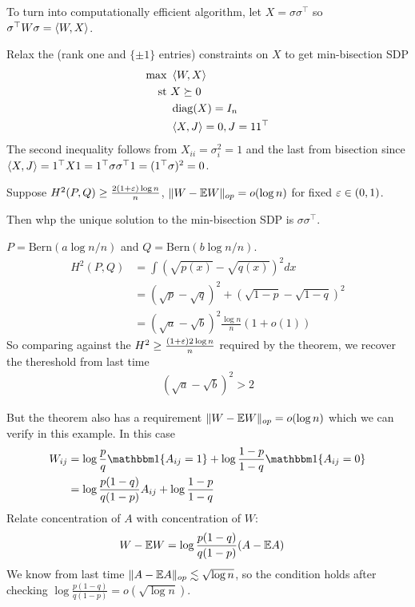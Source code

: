 To turn into computationally efficient algorithm, let
$X = \sigma \sigma^\top$ so $\sigma^\top W \sigma = \braket{W, X}$.

Relax the (rank one and $\{\pm 1\}$ entries) constraints on $X$
to get min-bisection SDP
\begin{align}
  \max~&\braket{W, X} \\
  \text{st}~&X \succeq 0 \\
  &\operatorname{diag}(X) = I_n \\
  &\braket{X, J} = 0, J = 1 1^\top
\end{align}
The second inequality follows from $X_{ii} = \sigma_i^2 = 1$
and the last from bisection since $\braket{X, J} = 1^\top X 1 = 1^\top \sigma \sigma^\top 1 = (1^\top \sigma)^2 = 0$.

\begin{theorem}
  Suppose $H^2(P, Q) \geq \frac{2 (1 + \varepsilon) \log n}{n}$,
  $\|W - \mathbb{E} W\|_{op} = o(\log n)$ for fixed $\varepsilon \in (0,1)$.

  Then whp the unique solution to the min-bisection SDP
  is $\sigma \sigma^\top$.
\end{theorem}

\begin{example}
  $P = \text{Bern}(a \log n / n)$
  and $Q = \text{Bern}(b \log n / n)$.
  \begin{align}
    H^2(P, Q) &= \int (\sqrt{p(x)} - \sqrt{q(x)})^2 dx \\
    &= (\sqrt{p} - \sqrt{q})^2 + (\sqrt{1-p} - \sqrt{1 - q})^2 \\
    &= (\sqrt{a} - \sqrt{b})^2 \frac{\log n}{n} (1 + o(1))
  \end{align}
  So comparing against the $H^2 \geq \frac{(1+\varepsilon) 2 \log n}{n}$ required
  by the theorem, we recover the thereshold from last time
  \begin{align}
    (\sqrt{a} - \sqrt{b})^2 > 2
  \end{align}

  But the theorem also has a requirement $\|W - \mathbb{E} W\|_{op} = o(\log n)$
  which we can verify in this example. In this case
  \begin{align}
    W_{ij} 
    &= \log \frac{p}{q} \ind\{A_{ij} = 1\} + \log \frac{1-p}{1-q} \ind\{A_{ij} = 0\} \\
    &= \log \frac{p (1-q)}{q (1-p)} A_{ij} + \log \frac{1-p}{1-q}
  \end{align}
  Relate concentration of $A$ with concentration of $W$:
  \begin{align}
    W - \mathbb{E} W 
    &= \log \frac{p (1 - q)}{q (1 - p)} (A - \mathbb{E} A)
  \end{align}
  We know from last time $\|A - \mathbb{E} A\|_{op} \lesssim \sqrt{\log n}$,
  so the condition holds after checking 
  $\log \frac{p(1-q)}{q(1-p)} = o(\sqrt{\log n})$.
\end{example}


